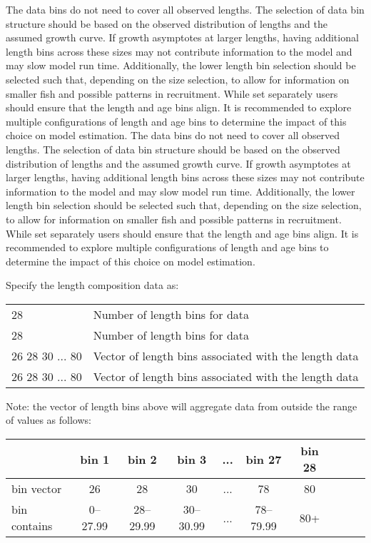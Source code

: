 The data bins do not need to cover all observed lengths. The selection of data bin structure should be based on the observed distribution of lengths and the assumed growth curve. If growth asymptotes at larger lengths, having additional length bins across these sizes may not contribute information to the model and may slow model run time. Additionally, the lower length bin selection should be selected such that, depending on the size selection, to allow for information on smaller fish and possible patterns in recruitment. While set separately users should ensure that the length and age bins align. It is recommended to explore multiple configurations of length and age bins to determine the impact of this choice on model estimation.
The data bins do not need to cover all observed lengths. The selection of data bin structure should be based on the observed distribution of lengths and the assumed growth curve. If growth asymptotes at larger lengths, having additional length bins across these sizes may not contribute information to the model and may slow model run time. Additionally, the lower length bin selection should be selected such that, depending on the size selection, to allow for information on smaller fish and possible patterns in recruitment. While set separately users should ensure that the length and age bins align. It is recommended to explore multiple configurations of length and age bins to determine the impact of this choice on model estimation.

Specify the length composition data as:
\begin{center}
	\begin{tabular}{p{4cm} p{10cm}}
		\hline
		28 & Number of length bins for data \\
		28 & Number of length bins for data \\
		\hline
		26 28 30 ... 80 & Vector of length bins associated with the length data \\
		26 28 30 ... 80 & Vector of length bins associated with the length data \\
		\hline
	\end{tabular}
\end{center}
Note: the vector of length bins above will aggregate data from outside
the range of values as follows:
\begin{center}
    \begin{tabular}{lccccccccc}
		\hline
  		             & bin 1 & bin 2 & bin 3 & ... & bin 27 & bin 28 \\ 
		\hline
 		bin vector   & 26 & 28 & 30 & ... & 78 & 80 \\ 
    	bin contains & 0--27.99 & 28--29.99 & 30--30.99 & ... & 78--79.99 & 80+ \\
		\hline
    \end{tabular}
\end{center}

